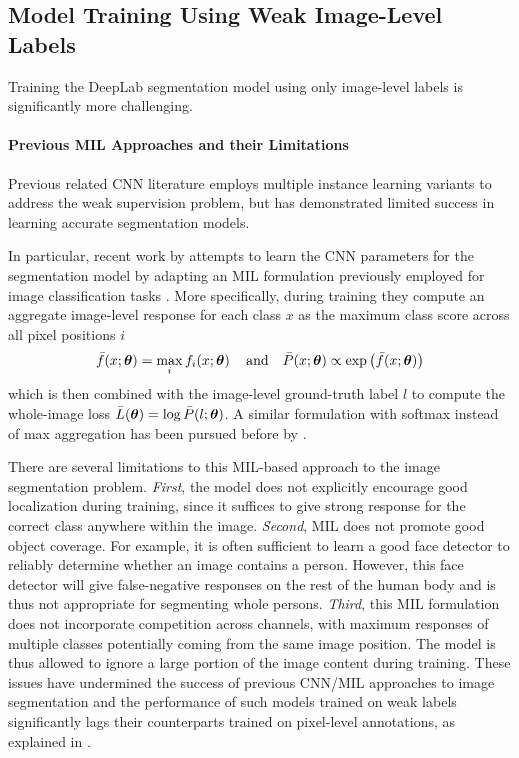 \subsection{Model Training Using Weak Image-Level Labels}
\label{sec:train_image}

Training the DeepLab segmentation model using only image-level labels
is significantly more challenging.

\paragraph{Previous MIL Approaches and their Limitations}

Previous related CNN literature employs multiple instance learning
variants to address the weak supervision problem, but has demonstrated
limited success in learning accurate segmentation models. 

In particular, recent work by \citet{pathak2014fully} attempts to
learn the CNN parameters for the segmentation model by adapting an MIL
formulation previously employed for image classification tasks
\citep{oquab2014weakly, papandreou2014untangling}. More specifically,
during training they compute an aggregate image-level response for
each class $x$ as the maximum class score across all pixel positions
$i$
\begin{equation}
  \label{eq:mil}
  \bar{f}(x; \boldsymbol{\theta}) = \max_i f_i(x; \boldsymbol{\theta}) \,
  \quad \mathrm{and} \quad
  \bar{P}(x; \boldsymbol{\theta}) \propto \exp \left( \bar{f}(x; \boldsymbol{\theta}) \right)
\end{equation}
which is then combined with the image-level ground-truth label $l$ to
compute the whole-image loss $\bar{L}(\boldsymbol{\theta}) = \log \bar{P}(l;
\boldsymbol{\theta})$. A similar formulation with softmax instead of max
aggregation has been pursued before by \citet{pinheiro2014weakly}.

There are several limitations to this MIL-based approach to the image
segmentation problem. \emph{First}, the model does not explicitly
encourage good localization during training, since it suffices to give
strong response for the correct class anywhere within the
image. \emph{Second}, MIL does not promote good
object coverage. For example, it is often sufficient to learn a good
face detector to reliably determine whether an image contains a
person. However, this face detector will give false-negative
responses on the rest of the human body and is thus not appropriate
for segmenting whole persons. \emph{Third}, this MIL formulation
does not incorporate competition across channels, with maximum
responses of multiple classes potentially coming from the same image
position. The model is thus allowed to ignore a large portion of the
image content during training.
These issues have undermined the success of previous CNN/MIL
approaches to image segmentation and the performance of such models
trained on weak labels significantly lags their counterparts trained
on pixel-level annotations, as explained in .

